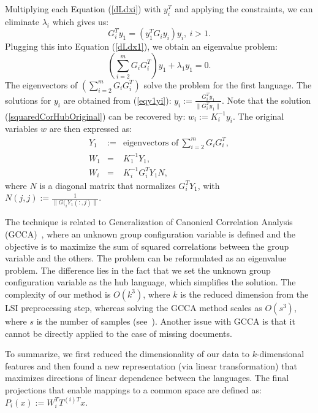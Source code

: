 Multiplying each Equation (\ref{dLdxi}) with $y_i^T$ and applying the
constraints, we can eliminate $\lambda_i$ which gives us:
\begin{equation}\label{eqy1yi}
G_{i}^T y_1 = \left(y_1^T G_{i} y_i \right) y_i,~i > 1.
\end{equation}
Plugging this into Equation (\ref{dLdx1}), we obtain an eigenvalue problem:
$$\left( \sum_{i = 2}^m G_i G_{i}^T \right) y_1 + \lambda_1 y_1 = 0.$$
The eigenvectors of $\left( \sum_{i = 2}^m G_i G_{i}^T \right)$ solve
the problem for the first language. The solutions for $y_i$ are obtained
from (\ref{eqy1yi}): $y_i := \frac{G_{i}^T y_1}{\| G_{i}^T y_1 \|}$.
Note that the solution (\ref{squaredCorHubOriginal}) can be recovered
by: $w_i := K_i^{-1} y_i$. The original variables $w$
are then expressed as:
\begin{eqnarray}
Y_1 & := & \text{eigenvectors of}~\sum_{i = 2}^m G_i G_{i}^T,\\
W_1 &  = & K_1^{-1} Y_1,\\
W_i &  = & K_i^{-1} G_{i}^T Y_1 N,
\end{eqnarray}
where $N$ is a diagonal matrix that normalizes $G_{i}^T Y_1$, with
$N(j,j) := \frac{1}{\|G(_{i} Y_1(:,j)\|}$.

 The technique is related to  Generalization of Canonical
Correlation Analysis (GCCA)~\cite{Carroll}, where an unknown
group configuration variable is defined and the objective is to maximize the
sum of squared correlations between the group variable and the others. The
problem can be reformulated as an eigenvalue problem. The difference lies in
the fact that we set the unknown group configuration variable as the hub language,
which simplifies the solution. The complexity of our method is $O(k^3)$, where $k$
is the reduced dimension from the LSI preprocessing step, whereas solving the
GCCA method scales as $O(s^3)$, where $s$ is the number of samples (see~\cite{gifi}).
Another issue with GCCA is that it cannot be directly applied to the case of missing documents.

To summarize, we first reduced the dimensionality of our data to $k$-dimensional
features and then found a new representation (via linear transformation) that
maximizes directions of linear dependence between the languages. The final
projections that enable mappings to a common space are defined as:
$P_i(x) := W_i^T T^{(i)T} x.$


